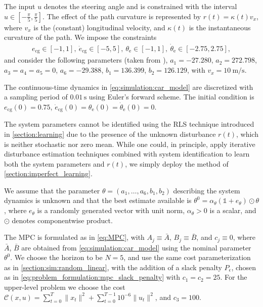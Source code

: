 \documentclass[journal,twoside,web,final]{ieeecolor}
\theoremstyle{definition}
\begin{document}
The input $u$ denotes the steering angle and is constrained with the interval $u\in[-\frac{\pi}{5},\frac{\pi}{5}]$.
The effect of the path curvature is represented by $r(t)=\kappa(t)v_x$, 
where $v_x$ is the (constant) longitudinal velocity, 
and $\kappa(t)$ is the instantaneous curvature of the path.
We impose the constraints
\begin{align*}
e_\text{cg} \in [-1,1],~ \dot{e}_\text{cg} \! \in [-5,5], ~ \theta_\text{e} \in [-1,1], ~ \dot{\theta}_\text{e} \in [-2.75,2.75],
\end{align*}
and consider the following parameters (taken from \cite{snider2009automatic}),
$a_1=-27.280$, $a_2=272.798$, $a_3=a_4=a_5=0$, $a_6=-29.388$, $b_1=136.399$, $b_2=126.129$,
with $v_x=\SI{10}{\meter/\second}$.

The continuous-time dynamics in \cref{eq:simulation:car_model} are discretized with a sampling period of $0.01\,\text{s}$ using Euler's forward scheme.
The initial condition is $e_\text{cg}(0)=0.75$, $\dot{e}_\text{cg}(0)=\theta_\text{e}(0)=\dot{\theta}_\text{e}(0)=0$.

The system parameters cannot be identified using the RLS technique introduced in \cref{section:learning} due to the presence of the unknown disturbance $r(t)$,
which is neither stochastic nor zero mean.
While one could, in principle, apply iterative disturbance estimation techniques combined with system identification to learn both the system parameters and $r(t)$, 
we simply deploy the method of \cref{section:imperfect_learning}.

We assume that the parameter $\theta=(a_1,\dots,a_6,b_1,b_2)$ describing the system dynamics is unknown and that the best estimate available is $\theta^0=\alpha_\theta (\mathds{1} + e_\theta) \odot \theta$, where $e_\theta$ is a randomly generated vector with unit norm, 
$\alpha_\theta>0$ is a scalar, 
and $\odot$ denotes componentwise product.

The MPC is formulated as in \cref{eq:MPC}, 
with $A_j \equiv \bar{A}$, 
$B_j \equiv \bar{B}$,
and $c_j \equiv 0$,
where $\bar{A}$, $\bar{B}$ are obtained from \cref{eq:simulation:car_model} using the nominal parameter $\theta^0$.
We choose the horizon to be $N=5$, and use the same cost parameterization as in \cref{section:sim:random_linear}, with the addition of a slack penalty $P_\epsilon$, chosen as in \cref{eq:problem_formulation:mpc_slack_penalty} with $c_1=c_2=25$.
For the upper-level problem we choose the cost $\mathcal{C}(x,u)=\sum_{t=0}^{T} \|x_t\|^2 + \sum_{t=0}^{T-1} 10^{-6}\|u_t\|^2$, and $c_3=100$.
\end{document}
